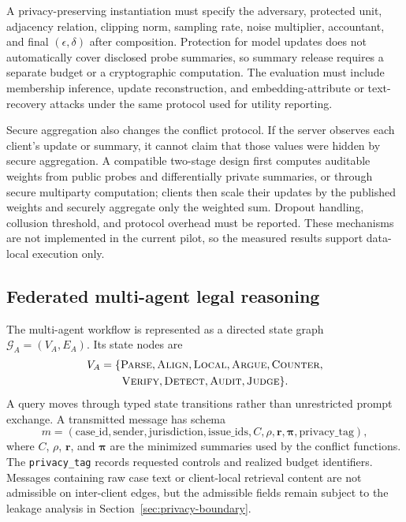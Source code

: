 \documentclass[preprint,12pt,authoryear]{elsarticle}
\newcommand{\graph}{\mathcal{G}}
\begin{document}
A privacy-preserving instantiation must specify the adversary, protected unit, adjacency relation, clipping norm, sampling rate, noise multiplier, accountant, and final $(\epsilon,\delta)$ after composition. Protection for model updates does not automatically cover disclosed probe summaries, so summary release requires a separate budget or a cryptographic computation. The evaluation must include membership inference, update reconstruction, and embedding-attribute or text-recovery attacks under the same protocol used for utility reporting.

Secure aggregation also changes the conflict protocol. If the server observes each client's update or summary, it cannot claim that those values were hidden by secure aggregation. A compatible two-stage design first computes auditable weights from public probes and differentially private summaries, or through secure multiparty computation; clients then scale their updates by the published weights and securely aggregate only the weighted sum. Dropout handling, collusion threshold, and protocol overhead must be reported. These mechanisms are not implemented in the current pilot, so the measured results support data-local execution only.

\subsection{Federated multi-agent legal reasoning}

The multi-agent workflow is represented as a directed state graph $\graph_A=(V_A,E_A)$. Its state nodes are
\begin{multline*}
V_A = \{\textsc{Parse},\textsc{Align},\textsc{Local},\textsc{Argue},\textsc{Counter},\\
\textsc{Verify},\textsc{Detect},\textsc{Audit},\textsc{Judge}\}.
\end{multline*}
A query moves through typed state transitions rather than unrestricted prompt exchange. A transmitted message has schema
\begin{equation}
    m = (\mathrm{case\_id}, \mathrm{sender}, \mathrm{jurisdiction},
    \mathrm{issue\_ids}, C, \rho, \bm{r}, \bm{\pi}, \mathrm{privacy\_tag}),
\end{equation}
where $C$, $\rho$, $\bm{r}$, and $\bm{\pi}$ are the minimized summaries used by the conflict functions. The \texttt{privacy\_tag} records requested controls and realized budget identifiers. Messages containing raw case text or client-local retrieval content are not admissible on inter-client edges, but the admissible fields remain subject to the leakage analysis in Section~\ref{sec:privacy-boundary}.
\end{document}
